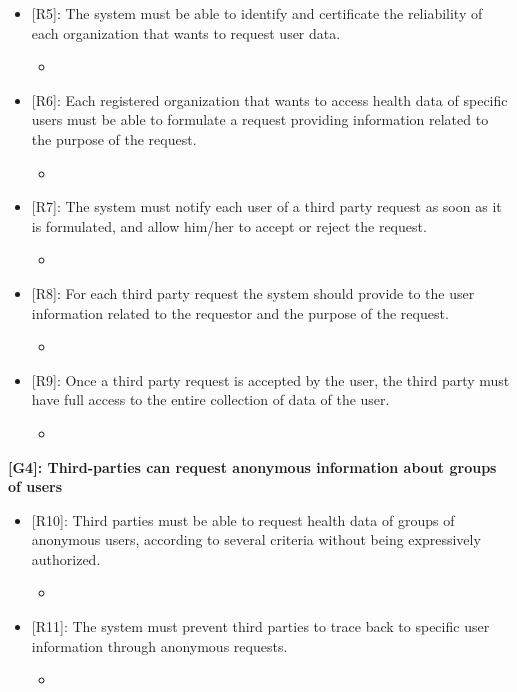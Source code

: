 \begin{itemize}
	\item {[R5]: The system must be able to identify and certificate the reliability of each organization that wants to request user data.}
	\begin{itemize}
		\item {}
	\end{itemize}   
	\item {[R6]: Each registered organization that wants to access health data of specific users must be able to formulate a request providing information related to the purpose of the request.}
	\begin{itemize}
		\item {}
	\end{itemize}   
	\item {[R7]: The system must notify each user of a third party request as soon as it is formulated, and allow him/her to accept or reject the request.}
	\begin{itemize}
		\item {}
	\end{itemize}   
	\item {[R8]: For each third party request the system should provide to the user information related to the requestor and the purpose of the request.}
	\begin{itemize}
		\item {}
	\end{itemize}   
	\item {[R9]: Once a third party request is accepted by the user, the third party must have full access to the entire collection of data of the user.}
	\begin{itemize}
		\item {}
	\end{itemize}   
\end{itemize}

\textbf{[G4]: Third-parties can request anonymous information about groups of users}

\begin{itemize}
	\item {[R10]: Third parties must be able to request health data of groups of anonymous users, according to several criteria without being expressively authorized.}
	\begin{itemize}
		\item {}
	\end{itemize}   
	\item {[R11]: The system must prevent third parties to trace back to specific user information through anonymous requests.}
	\begin{itemize}
		\item {}
	\end{itemize}   
\end{itemize}


